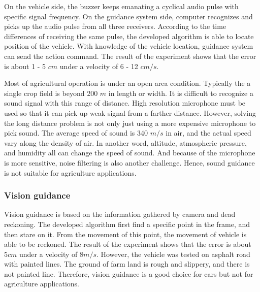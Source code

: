 \documentclass[12pt]{article}
\begin{document}
\begin{flushleft}
On the vehicle side, the buzzer keeps emanating a cyclical audio pulse with specific signal frequency. On the guidance system side, computer recognizes and picks up the audio pulse from all three receivers. According to the time differences of receiving the same pulse, the developed algorithm is able to locate position of the vehicle. With knowledge of the vehicle location, guidance system can send the action command. The result of the experiment shows that the error is about 1 - 5 $cm$ under a velocity of 6 - 12 $cm/s$.\cite{yuping2011sound}

Most of agricultural operation is under an open area condition. Typically the a single crop field is beyond 200 $m$ in length or width. It is difficult to recognize a sound signal with this range of distance.  High resolution microphone must be used so that it can pick up weak signal from a farther distance. However, solving the long distance problem is not only just using a more expensive microphone to pick sound. The average speed of sound is 340 $m/s$ in air, and the actual speed vary along the density of air. In another word, altitude, atmospheric pressure, and humidity all can change the speed of sound. And because of the microphone is more sensitive, noise filtering is also another challenge. Hence, sound guidance is not suitable for agriculture applications.

\subsubsection{Vision guidance}
Vision guidance is based on the information gathered by camera and dead reckoning. The developed algorithm first find a specific point in the frame, and then stare on it. From the movement of this point, the movement of vehicle is able to be reckoned. The result of the experiment shows that the error is about $5 cm$ under a velocity of $8 m/s$. \cite{jiang2006algorithm} However, the vehicle was tested on asphalt road with painted lines. The ground of farm land is rough and slippery, and there is not painted line. Therefore, vision guidance is a good choice for cars but not for agriculture applications.


\end{flushleft}
\end{document}
